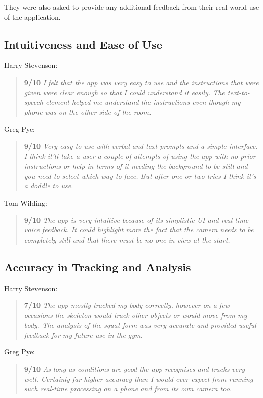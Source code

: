 They were also asked to provide any additional feedback from their real-world use of the application.


\subsection{Intuitiveness and Ease of Use}

Harry Stevenson:
\begin{quote}
\textbf{9/10} \emph{I felt that the app was very easy to use and the instructions that were given were clear enough so that I could understand it easily. The text-to-speech element helped me understand the instructions even though my phone was on the other side of the room.}
\end{quote}

Greg Pye:
\begin{quote}
\textbf{9/10} \emph{Very easy to use with verbal and text prompts and a simple interface. I think it'll take a user a couple of attempts of using the app with no prior instructions or help in terms of it needing the background to be still and you need to select which way to face. But after one or two tries I think it's a doddle to use.}
\end{quote}

Tom Wilding:
\begin{quote}
\textbf{9/10} \emph{The app is very intuitive because of its simplistic UI and real-time voice feedback. It could highlight more the fact that the camera needs to be completely still and that there must be no one in view at the start.}
\end{quote}

\subsection{Accuracy in Tracking and Analysis}

Harry Stevenson:
\begin{quote}
\textbf{7/10} \emph{The app mostly tracked my body correctly, however on a few occasions the skeleton would track other objects or would move from my body. The analysis of the squat form was very accurate and provided useful feedback for my future use in the gym.}
\end{quote}

Greg Pye:
\begin{quote}
\textbf{9/10} \emph{As long as conditions are good the app recognises and tracks very well. Certainly far higher accuracy than I would ever expect from running such real-time processing on a phone and from its own camera too.}
\end{quote}

